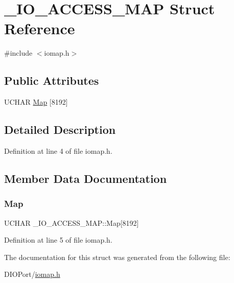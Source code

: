 \hypertarget{struct___i_o___a_c_c_e_s_s___m_a_p}{}\section{\+\_\+\+I\+O\+\_\+\+A\+C\+C\+E\+S\+S\+\_\+\+M\+AP Struct Reference}
\label{struct___i_o___a_c_c_e_s_s___m_a_p}


{\ttfamily \#include $<$iomap.\+h$>$}

\subsection*{Public Attributes}
\begin{DoxyCompactItemize}
\item 
U\+C\+H\+AR \mbox{\hyperlink{struct___i_o___a_c_c_e_s_s___m_a_p_a467d602867e438866c15699e11c1a1a8}{Map}} \mbox{[}8192\mbox{]}
\end{DoxyCompactItemize}


\subsection{Detailed Description}


Definition at line 4 of file iomap.\+h.



\subsection{Member Data Documentation}
\mbox{\label{struct___i_o___a_c_c_e_s_s___m_a_p_a467d602867e438866c15699e11c1a1a8}} 
\subsubsection{\texorpdfstring{Map}{Map}}
{\footnotesize\ttfamily U\+C\+H\+AR \+\_\+\+I\+O\+\_\+\+A\+C\+C\+E\+S\+S\+\_\+\+M\+A\+P\+::\+Map\mbox{[}8192\mbox{]}}



Definition at line 5 of file iomap.\+h.



The documentation for this struct was generated from the following file\+:\begin{DoxyCompactItemize}
\item 
D\+I\+O\+Port/\mbox{\hyperlink{iomap_8h}{iomap.\+h}}\end{DoxyCompactItemize}
